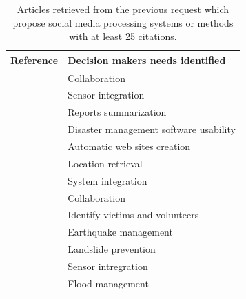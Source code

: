 \begin{table}[bp]
    \centering
    \renewcommand{\arraystretch}{1.5}
    \begin{tabular}{m{} m{}}
        Reference                                                & Decision makers needs identified       \\ [0.5ex]
        \toprule
        \cite{benabenMetamodelItsOntology2008b}                  & Collaboration                          \\
        \cite{babitskiOntologybasedIntegrationSensor2009a}       & Sensor integration                     \\
        \cite{liOntologyenrichedMultiDocumentSummarization2010a} & Reports summarization                  \\
        \cite{babitskiSoKNOSUsingSemantic2011a}                  & Disaster management software usability \\
        \cite{chouOntologyDevelopingWeb2011a}                    & Automatic web sites creation           \\
        \cite{ghahremanlouGeotaggingTwitterMessages2014a}        & Location retrieval                     \\
        \cite{madniSystemsIntegrationKey2014a}                   & System integration                     \\
        \cite{othmanDevelopmentValidationDisaster2014b}          & Collaboration                          \\
        \cite{purohitIdentifyingSeekersSuppliers2014a}           & Identify victims and volunteers        \\
        \cite{xuModelingRepresentationEarthquake2014a}           & Earthquake management                  \\
        \cite{jungOntologydrivenSlopeModeling2015a}              & Landslide prevention                   \\
        \cite{posladSemanticIoTEarly2015a}                       & Sensor intregration                    \\
        \cite{qiuIntegratedFloodManagement2017a}                 & Flood management                       \\
        \bottomrule
    \end{tabular}
    \caption{Articles retrieved from the previous request which propose social media processing systems or methods with at least 25 citations.}
    \label{table:situation-models-main-articles}
\end{table}

